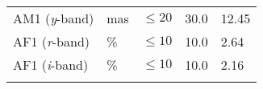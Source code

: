 \documentclass[DM,toc]{lsstdoc}
\begin{document}
\begin{longtable}[]{@{}lllll@{}}
\begin{minipage}[t]{0.19\columnwidth}\raggedright\strut
AM1 (\emph{y}-band)\strut
\end{minipage} & \begin{minipage}[t]{0.08\columnwidth}\raggedright\strut
mas\strut
\end{minipage} & \begin{minipage}[t]{0.20\columnwidth}\raggedright\strut
\(\leq 20\)\strut
\end{minipage} & \begin{minipage}[t]{0.22\columnwidth}\raggedright\strut
30.0\strut
\end{minipage} & \begin{minipage}[t]{0.17\columnwidth}\raggedright\strut
12.45\strut
\end{minipage}\tabularnewline
\begin{minipage}[t]{0.19\columnwidth}\raggedright\strut
AF1 (\emph{r}-band)\strut
\end{minipage} & \begin{minipage}[t]{0.08\columnwidth}\raggedright\strut
\%\strut
\end{minipage} & \begin{minipage}[t]{0.20\columnwidth}\raggedright\strut
\(\leq 10\)\strut
\end{minipage} & \begin{minipage}[t]{0.22\columnwidth}\raggedright\strut
10.0\strut
\end{minipage} & \begin{minipage}[t]{0.17\columnwidth}\raggedright\strut
2.64\strut
\end{minipage}\tabularnewline
\begin{minipage}[t]{0.19\columnwidth}\raggedright\strut
AF1 (\emph{i}-band)\strut
\end{minipage} & \begin{minipage}[t]{0.08\columnwidth}\raggedright\strut
\%\strut
\end{minipage} & \begin{minipage}[t]{0.20\columnwidth}\raggedright\strut
\(\leq 10\)\strut
\end{minipage} & \begin{minipage}[t]{0.22\columnwidth}\raggedright\strut
10.0\strut
\end{minipage} & \begin{minipage}[t]{0.17\columnwidth}\raggedright\strut
2.16\strut
\end{minipage}\tabularnewline
\begin{minipage}[t]{0.19\columnwidth}\raggedright\strut

\end{minipage}
\end{longtable}
\end{document}
